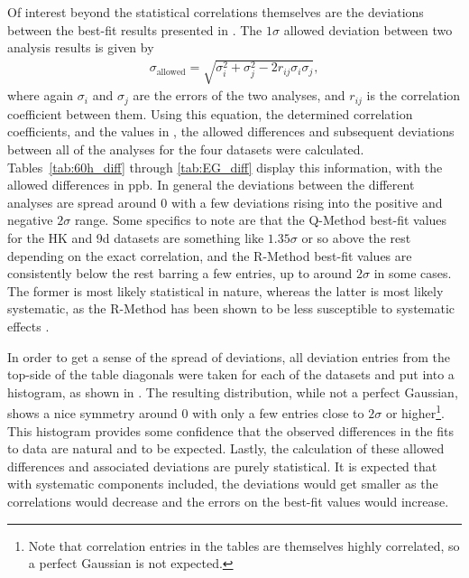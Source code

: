Of interest beyond the statistical correlations themselves are the deviations between the best-fit \R results presented in . The $1\sigma$ allowed deviation between two analysis results is given by
\begin{align}
	\sigma_{\text{allowed}} = \sqrt{\sigma^{2}_{i} + \sigma^{2}_{j} - 2r_{ij}\sigma_{i}\sigma_{j}},
\end{align}
where again $\sigma_{i}$ and $\sigma_{j}$ are the errors of the two analyses, and $r_{ij}$ is the correlation coefficient between them. Using this equation, the determined correlation coefficients, and the values in , the allowed differences and subsequent deviations between all of the analyses for the four datasets were calculated. Tables~\ref{tab:60h_diff} through \ref{tab:EG_diff} display this information, with the allowed differences in ppb. In general the deviations between the different analyses are spread around 0 with a few deviations rising into the positive and negative $2\sigma$ range. Some specifics to note are that the Q-Method best-fit \R values for the HK and 9d datasets are something like $1.35\sigma$ or so above the rest depending on the exact correlation, and the R-Method best-fit \R values are consistently below the rest barring a few entries, up to around $2\sigma$ in some cases. The former is most likely statistical in nature, whereas the latter is most likely systematic, as the R-Method has been shown to be less susceptible to systematic effects \cite{phdthesis:2020Kinnaird}.

In order to get a sense of the spread of deviations, all deviation entries from the top-side of the table diagonals were taken for each of the datasets and put into a histogram, as shown in . The resulting distribution, while not a perfect Gaussian, shows a nice symmetry around 0 with only a few entries close to $2\sigma$ or higher\footnote{Note that correlation entries in the tables are themselves highly correlated, so a perfect Gaussian is not expected.}. This histogram provides some confidence that the observed differences in the fits to data are natural and to be expected. Lastly, the calculation of these allowed differences and associated deviations are purely statistical. It is expected that with systematic components included, the deviations would get smaller as the correlations would decrease and the errors on the best-fit \R values would increase.


